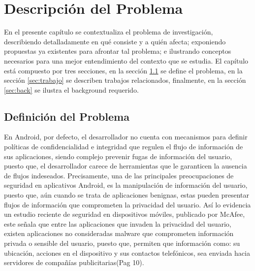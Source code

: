 \chapter{Descripción del Problema}
\label{ch:problema}
En el presente capítulo se contextualiza el problema de investigación,
describiendo detalladamente en qué consiste y a quién afecta; exponiendo
propuestas ya existentes para afrontar tal problema; e ilustrando
conceptos necesarios para una mejor entendimiento del contexto que se estudia.
El capítulo está compuesto por tres secciones, en la sección
\ref{sec:definicion} se define el problema, en la sección \ref{sec:trabajo} se
describen trabajos relacionados, finalmente, en la sección \ref{sec:back} se
ilustra el background requerido.

\section{Definición del Problema}
\label{sec:definicion}
En Android, por defecto, el desarrollador no cuenta con mecanismos para definir
políticas de confidencialidad e integridad que regulen el flujo de información
de sus aplicaciones, siendo complejo prevenir fugas de información del usuario,
puesto que, el desarrollador carece de herramientas que le garanticen la
ausencia de flujos indeseados. \newline
Precisamente, una de las principales preocupaciones de seguridad en aplicativos
Android, es la manipulación de información del usuario, puesto que, aún cuando
se trata de aplicaciones benignas, estas pueden presentar flujos de información
que comprometen la privacidad del usuario. \newline
Así lo evidencia un estudio reciente de seguridad en dispositivos móviles,
publicado por McAfee\cite{McAfeeReport}, este señala que entre las aplicaciones
que invaden la privacidad del usuario, existen aplicaciones no consideradas
malware que comprometen información privada o sensible del usuario,
puesto que, permiten que información como: su ubicación,
acciones en el dispositivo y sus contactos telefónicos, sea enviada hacia
servidores de compañías publicitarias\cite{McAfeeReport}(Pag 10).\newline
% 
% 
